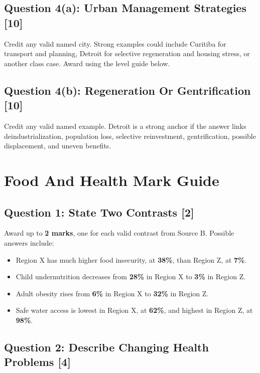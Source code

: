 \documentclass[11pt,a4paper]{article}
\newcommand{\term}[1]{\textcolor{HeadingBlue}{\textbf{#1}}}
\begin{document}
\subsection{Question 4(a): Urban Management Strategies [10]}

Credit any valid named city. Strong examples could include Curitiba for
transport and planning, Detroit for selective regeneration and housing stress,
or another class case. Award using the level guide below.

\subsection{Question 4(b): Regeneration Or Gentrification [10]}

Credit any valid named example. Detroit is a strong anchor if the answer links
deindustrialization, population loss, selective reinvestment, gentrification,
possible displacement, and uneven benefits.

\section{Food And Health Mark Guide}

\subsection{Question 1: State Two Contrasts [2]}

Award up to \term{2 marks}, one for each valid contrast from Source B.
Possible answers include:

\begin{itemize}
  \item Region X has much higher food insecurity, at \term{38\%}, than Region Z,
  at \term{7\%}.
  \item Child undernutrition decreases from \term{28\%} in Region X to
  \term{3\%} in Region Z.
  \item Adult obesity rises from \term{6\%} in Region X to \term{32\%} in
  Region Z.
  \item Safe water access is lowest in Region X, at \term{62\%}, and highest in
  Region Z, at \term{98\%}.
\end{itemize}

\subsection{Question 2: Describe Changing Health Problems [4]}
\end{document}
